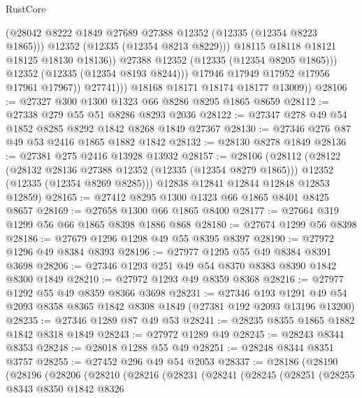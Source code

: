 \begin{lexlean}{RustCore}
\begin{coremodule}
                            (@28042 @8222 @1849 @27689 @27388 @12352 (@12335 (@12354 @8223 @1865)))
                            @12352
                            (@12335 (@12354 @8213 @8229)))
                          @18115
                          @18118
                          @18121
                          @18125
                          @18130
                          @18136))
                      @27388
                      @12352
                      (@12335 (@12354 @8205 @1865)))
                    @12352
                    (@12335 (@12354 @8193 @8244)))
                  @17946
                  @17949
                  @17952
                  @17956
                  @17961
                  @17967))
              @27741)))
        @18168
        @18171
        @18174
        @18177
        @13009))
@28106 := @27327 @300 @1300 @1323 @66 @8286 @8295 @1865 @8659
@28112 := @27338 @279 @55 @51 @8286 @8293 @2036
@28122 := @27347 @278 @49 @54 @1852 @8285 @8292 @1842 @8268 @1849 @27367
@28130 := @27346 @276 @87 @49 @53 @2416 @1865 @1882 @1842
@28132 := @28130 @8278 @1849
@28136 := @27381 @275 @2416 @13928 @13932
@28157 := @28106
    (@28112
      (@28122
        (@28132 @28136 @27388 @12352 (@12335 (@12354 @8279 @1865)))
        @12352
        (@12335 (@12354 @8269 @8285)))
      @12838
      @12841
      @12844
      @12848
      @12853
      @12859)
@28165 := @27412 @8295 @1300 @1323 @66 @1865 @8401 @8425 @8657
@28169 := @27658 @1300 @66 @1865 @8400
@28177 := @27664 @319 @1299 @56 @66 @1865 @8398 @1886 @868
@28180 := @27674 @1299 @56 @8398
@28186 := @27679 @1296 @1298 @49 @55 @8395 @8397
@28190 := @27972 @1296 @49 @8384 @8393
@28196 := @27977 @1295 @55 @49 @8384 @8391 @3698
@28206 := @27346 @1293 @251 @49 @54 @8370 @8383 @8390 @1842 @8300 @1849
@28210 := @27972 @1293 @49 @8359 @8368
@28216 := @27977 @1292 @55 @49 @8359 @8366 @3698
@28231 := @27346
    @193
    @1291
    @49
    @54
    @2093
    @8358
    @8365
    @1842
    @8308
    @1849
    (@27381 @192 @2093 @13196 @13200)
@28235 := @27346 @1289 @87 @49 @53
@28241 := @28235 @8355 @1865 @1882 @1842 @8318 @1849
@28243 := @27972 @1289 @49
@28245 := @28243 @8344 @8353
@28248 := @28018 @1288 @55 @49
@28251 := @28248 @8344 @8351 @3757
@28255 := @27452 @296 @49 @54 @2053
@28337 := @28186
    (@28190
      (@28196
        (@28206
          (@28210
            (@28216
              (@28231
                (@28241
                  (@28245
                    (@28251
                      (@28255
                        @8343
                        @8350
                        @1842
                        @8326

\end{coremodule}
\end{lexlean}
